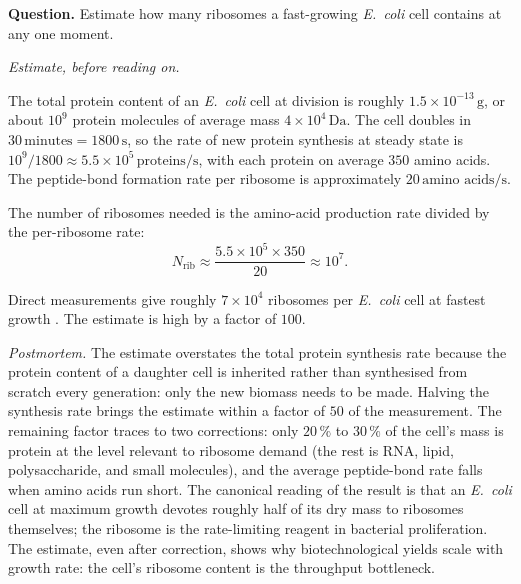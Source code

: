 \begin{estimation}
\textbf{Question.} Estimate how many ribosomes a fast-growing
\emph{E.~coli} cell contains at any one moment.

\smallskip
\textit{Estimate, before reading on.}

\smallskip
The total protein content of an \emph{E.~coli} cell at division is
roughly $1.5 \times 10^{-13}\,\text{g}$, or about $10^9$ protein
molecules of average mass $4 \times 10^4\,\text{Da}$. The cell
doubles in $30\,\text{minutes} = 1800\,\text{s}$, so the rate of new
protein synthesis at steady state is $10^9 / 1800 \approx 5.5 \times
10^5\,\text{proteins}/\text{s}$, with each protein on average
$350$ amino acids. The peptide-bond formation rate per ribosome is
approximately $20\,\text{amino acids}/\text{s}$.

The number of ribosomes needed is the amino-acid production rate
divided by the per-ribosome rate:
\[
N_{\text{rib}} \approx \frac{5.5 \times 10^5 \times 350}{20}
\approx 10^7.
\]

Direct measurements give roughly $7 \times 10^4$ ribosomes per
\emph{E.~coli} cell at fastest growth \cite[ch.~17]{text:lehninger-biochemistry}.
The estimate is high by a factor of $100$.

\smallskip
\textit{Postmortem.} The estimate overstates the total protein
synthesis rate because the protein content of a daughter cell is
inherited rather than synthesised from scratch every generation: only
the new biomass needs to be made. Halving the synthesis rate brings
the estimate within a factor of $50$ of the measurement. The
remaining factor traces to two corrections: only $20\,\%$ to $30\,\%$
of the cell's mass is protein at the level relevant to ribosome demand
(the rest is RNA, lipid, polysaccharide, and small molecules), and
the average peptide-bond rate falls when amino acids run short. The
canonical reading of the result is that an \emph{E.~coli} cell at
maximum growth devotes roughly half of its dry mass to ribosomes
themselves; the ribosome is the rate-limiting reagent in bacterial
proliferation. The estimate, even after correction, shows why
biotechnological yields scale with growth rate: the cell's ribosome
content is the throughput bottleneck.
\end{estimation}

